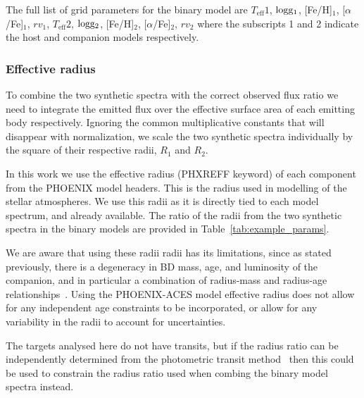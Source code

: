 {\rd{} The full list of grid parameters for the binary model are \(T_{\textrm{eff}}1\),  \(\rm logg_1\), [Fe/H]$_1$, [\(\alpha\)/Fe]$_1$, ${rv}_1$, \(T_{\textrm{eff}}2\), \(\rm logg_2\), [Fe/H]$_2$, [\(\alpha\)/Fe]$_2$, ${rv}_2$ where the subscripts 1 and 2 indicate the host and companion models respectively.}






\subsubsection{Effective radius}
\label{subsection-radius}

To combine the two synthetic spectra with the correct observed flux ratio we need to integrate the emitted flux over the effective surface area of each emitting body respectively. Ignoring the common multiplicative constants that will disappear with normalization, we scale the two synthetic spectra individually by the square of their respective radii, \(R_1\) and \(R_2\). 

In this work we use the effective radius (PHXREFF keyword) of each component from the PHOENIX model headers. This is the radius used in modelling of the stellar atmospheres. We use this radii as it is directly tied to each model spectrum, and already available. The ratio of the radii from the two synthetic spectra in the binary models are provided in Table~\ref{tab:example_params}.

We are aware that using these radii radii has its limitations, since as stated previously, there is a degeneracy in BD mass, age, and luminosity of the companion, and in particular a combination of radius-mass and radius-age relationships~\citep{sorahana_radii_2013}. Using the PHOENIX-ACES model effective radius does not allow for any independent age constraints to be incorporated, or allow for any variability in the radii to account for uncertainties.

The targets analysed here do not have transits, but if the radius ratio can be independently determined from the photometric transit method~\citep{deeg_photometric_1998} then this could be used to constrain the radius ratio used when combing the binary model spectra instead.


